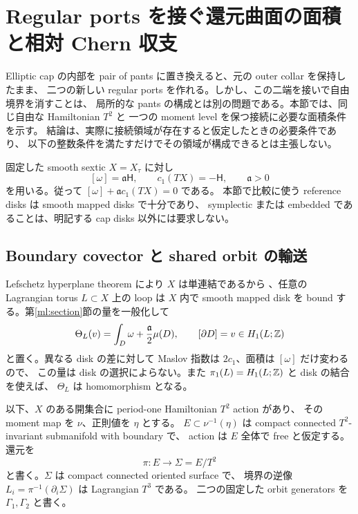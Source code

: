 \section{Regular ports を接ぐ還元曲面の面積と相対 Chern 収支}
\label{rsb:section}

Elliptic cap の内部を pair of pants に置き換えると、元の outer collar を保持したまま、
二つの新しい regular ports を作れる。しかし、この二端を接いで自由境界を消すことは、
局所的な pants の構成とは別の問題である。本節では、同じ自由な Hamiltonian $T^2$ と
一つの moment level を保つ接続に必要な面積条件を示す。
結論は、実際に接続領域が存在すると仮定したときの必要条件であり、
以下の整数条件を満たすだけでその領域が構成できるとは主張しない。

固定した smooth sextic $X=X_\tau$ に対し
\[
 [\omega]=\mathfrak a\mathsf H,\qquad
 c_1(TX)=-\mathsf H,\qquad \mathfrak a>0
\]
を用いる。従って $[\omega]+\mathfrak a c_1(TX)=0$ である。
本節で比較に使う reference disks は smooth mapped disks で十分であり、
symplectic または embedded であることは、明記する cap disks 以外には要求しない。

\subsection{Boundary covector と shared orbit の輸送}

Lefschetz hyperplane theorem により $X$ は単連結であるから
\cite[Corollary 2.3.4]{achinger-lefschetz-gc}、任意の Lagrangian torus $L\subset X$ 上の loop は
$X$ 内で smooth mapped disk を bound する。第\ref{ml:section}節の量を一般化して
\begin{equation}\label{rsb:theta}
 \Theta_L(v)=\int_D\omega+\frac{\mathfrak a}{2}\mu(D),
 \qquad [\partial D]=v\in H_1(L;\mathbb Z)
\end{equation}
と置く。異なる disk の差に対して Maslov 指数は $2c_1$、面積は $[\omega]$ だけ変わるので、
この量は disk の選択によらない。また $\pi_1(L)=H_1(L;\mathbb Z)$ と disk の結合を使えば、
$\Theta_L$ は homomorphism となる。

以下、$X$ のある開集合に period-one Hamiltonian $T^2$ action があり、
その moment map を $\nu$、正則値を $\eta$ とする。
$E\subset\nu^{-1}(\eta)$ は compact connected $T^2$-invariant submanifold with boundary で、
action は $E$ 全体で free と仮定する。還元を
\[
 \pi:E\longrightarrow\Sigma=E/T^2
\]
と書く。$\Sigma$ は compact connected oriented surface で、
境界の逆像 $L_i=\pi^{-1}(\partial_i\Sigma)$ は Lagrangian $T^3$ である。
二つの固定した orbit generators を $\Gamma_1,\Gamma_2$ と書く。

